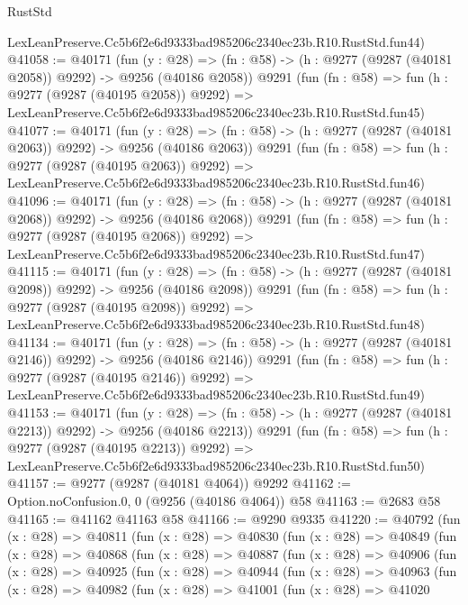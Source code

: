 \begin{lexlean}{RustStd}
\begin{coremodule}
    LexLeanPreserve.Cc5b6f2e6d9333bad985206c2340ec23b.R10.RustStd.fun44)
@41058 := @40171
    (fun (y : @28) =>
    (fn : @58) -> (h : @9277 (@9287 (@40181 @2058)) @9292) -> @9256 (@40186 @2058))
    @9291
    (fun (fn : @58) =>
    fun (h : @9277 (@9287 (@40195 @2058)) @9292) =>
    LexLeanPreserve.Cc5b6f2e6d9333bad985206c2340ec23b.R10.RustStd.fun45)
@41077 := @40171
    (fun (y : @28) =>
    (fn : @58) -> (h : @9277 (@9287 (@40181 @2063)) @9292) -> @9256 (@40186 @2063))
    @9291
    (fun (fn : @58) =>
    fun (h : @9277 (@9287 (@40195 @2063)) @9292) =>
    LexLeanPreserve.Cc5b6f2e6d9333bad985206c2340ec23b.R10.RustStd.fun46)
@41096 := @40171
    (fun (y : @28) =>
    (fn : @58) -> (h : @9277 (@9287 (@40181 @2068)) @9292) -> @9256 (@40186 @2068))
    @9291
    (fun (fn : @58) =>
    fun (h : @9277 (@9287 (@40195 @2068)) @9292) =>
    LexLeanPreserve.Cc5b6f2e6d9333bad985206c2340ec23b.R10.RustStd.fun47)
@41115 := @40171
    (fun (y : @28) =>
    (fn : @58) -> (h : @9277 (@9287 (@40181 @2098)) @9292) -> @9256 (@40186 @2098))
    @9291
    (fun (fn : @58) =>
    fun (h : @9277 (@9287 (@40195 @2098)) @9292) =>
    LexLeanPreserve.Cc5b6f2e6d9333bad985206c2340ec23b.R10.RustStd.fun48)
@41134 := @40171
    (fun (y : @28) =>
    (fn : @58) -> (h : @9277 (@9287 (@40181 @2146)) @9292) -> @9256 (@40186 @2146))
    @9291
    (fun (fn : @58) =>
    fun (h : @9277 (@9287 (@40195 @2146)) @9292) =>
    LexLeanPreserve.Cc5b6f2e6d9333bad985206c2340ec23b.R10.RustStd.fun49)
@41153 := @40171
    (fun (y : @28) =>
    (fn : @58) -> (h : @9277 (@9287 (@40181 @2213)) @9292) -> @9256 (@40186 @2213))
    @9291
    (fun (fn : @58) =>
    fun (h : @9277 (@9287 (@40195 @2213)) @9292) =>
    LexLeanPreserve.Cc5b6f2e6d9333bad985206c2340ec23b.R10.RustStd.fun50)
@41157 := @9277 (@9287 (@40181 @4064)) @9292
@41162 := Option.noConfusion.{0, 0} (@9256 (@40186 @4064)) @58
@41163 := @2683 @58
@41165 := @41162 @41163 @58
@41166 := @9290 @9335
@41220 := @40792
    (fun (x : @28) =>
    @40811
      (fun (x : @28) =>
      @40830
        (fun (x : @28) =>
        @40849
          (fun (x : @28) =>
          @40868
            (fun (x : @28) =>
            @40887
              (fun (x : @28) =>
              @40906
                (fun (x : @28) =>
                @40925
                  (fun (x : @28) =>
                  @40944
                    (fun (x : @28) =>
                    @40963
                      (fun (x : @28) =>
                      @40982
                        (fun (x : @28) =>
                        @41001
                          (fun (x : @28) =>
                          @41020

\end{coremodule}
\end{lexlean}
